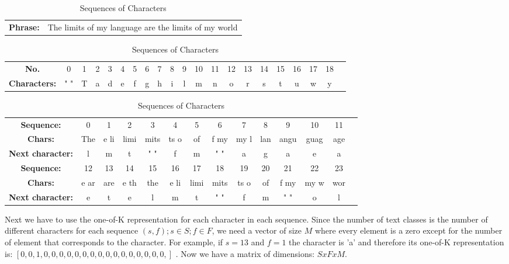 \begin{table}{}

\begin{tabular}{c c}
\textbf{Phrase: }&The limits of my language are the limits of my world \\
\end{tabular}
\begin{tabular}{c c c c c c c c c c c c c c c c c c c c c}
\textbf{No.}&0&1&2&3&4&5&6&7&8&9&10&11&12&13&14&15&16&17&18\\
\textbf{Characters:}& " "& T& a& d& e& f& g& h& i& l& m& n& o& r& s& t& u& w& y\\
\end{tabular}

\begin{tabular}{c c c c c c c c c c c c c c}
\textbf{Sequence:} &0&1&2 & 3 &4&5&6&7&8&9&10&11\\
\textbf{Chars:} &The &e li&limi&mits&ts o& of &f my&my l& lan&angu&guag&age\\ 
\textbf{Next character: }&l&m&t&" "&f&m&" "&a&g&a&e&a\\
\textbf{Sequence:} &12&13&14&15&16&17&18&19&20&21&22&23\\
\textbf{Chars:} &e ar&are &e th&the &e li&limi&mits&ts o& of &f my&my w& wor\\
\textbf{Next character: }&e&t&e&l&m&t&" "&f&m&" "&o&l\\
\end{tabular}

\caption{Sequences of Characters}
\label{tab:seqch}

\end{table}

Next we have to use the one-of-K representation for each character in each sequence. Since the number of text classes is the number of different characters for each sequence $(s,f);  s \in S; f \in F $, we need a vector of size $M$ where every element is a zero except for the number of element that corresponds to the character. For example, if $s=13$ and $f=1$ the character is 'a' and therefore its one-of-K representation is: $[0,0,1,0,0,0,0,0,0,0,0,0,0,0,0,0,0,0,0,]$ .
Now we have a matrix of dimensions: $SxFxM$.